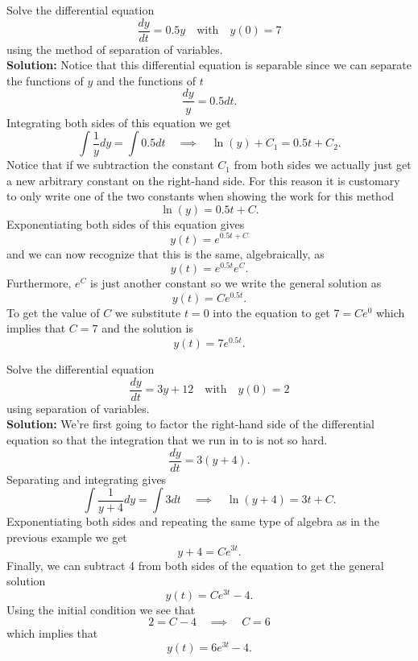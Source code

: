 \begin{example}
    Solve the differential equation 
    \[ \frac{dy}{dt} = 0.5 y \quad \text{with} \quad y(0) = 7 \]
    using the method of separation of variables.\\{\bf Solution:} Notice that this
    differential equation is separable since we can separate the functions of $y$ and the
    functions of $t$
    \[ \frac{dy}{y} = 0.5 dt. \]
    Integrating both sides of this equation we get
    \[ \int \frac{1}{y} dy = \int 0.5 dt \quad \implies \quad \ln(y) + C_1 = 0.5 t + C_2.
    \]
    Notice that if we subtraction the constant $C_1$ from both sides we actually just get
    a new arbitrary constant on the right-hand side.  For this reason it is customary to
    only write one of the two constants when showing the work for this method
    \[ \ln(y) = 0.5 t + C. \]
    Exponentiating both sides of this equation gives 
    \[ y(t) = e^{0.5 t + C} \]
    and we can now recognize that this is the same, algebraically, as
    \[ y(t) = e^{0.5t} e^C.  \]
    Furthermore, $e^C$ is just another constant so we write the general solution as 
    \[ y(t) = Ce^{0.5t}. \]
    To get the value of $C$ we substitute $t=0$ into the equation to get $7 = Ce^0$ which
    implies that $C= 7$ and the solution is 
    \[ y(t) = 7e^{0.5t}. \]
\end{example}

\begin{example}
    Solve the differential equation 
    \[ \frac{dy}{dt} = 3y+12 \quad \text{with} \quad y(0) = 2 \]
    using separation of variables. \\{\bf Solution:} We're first going to factor the
    right-hand side of the differential equation so that the integration that we run in to
    is not so hard.
    \[ \frac{dy}{dt} = 3(y+4). \]
    Separating and integrating gives
    \[ \int \frac{1}{y+4} dy = \int 3dt \quad \implies \quad \ln(y+4) = 3t+C. \]
    Exponentiating both sides and repeating the same type of algebra as in the previous
    example we get
    \[ y + 4 = Ce^{3t}. \]
    Finally, we can subtract 4 from both sides of the equation to get the general solution
    \[ y(t) = Ce^{3t} - 4. \]
    Using the initial condition we see that 
    \[ 2 = C - 4 \quad \implies \quad C=6 \]
    which implies that 
    \[ y(t) = 6 e^{3t} - 4. \]
\end{example}


